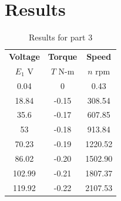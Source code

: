 \documentclass{article}
\begin{document}
\section{Results}

\begin{table}[H]
  \centering
  \begin{tabular}{*{3}{c}}

    \textbf{Voltage} & \textbf{Torque} & \textbf{Speed} \\
    $E_1$ V & $T$ N-m & $n$ rpm \\

    \hline

    0.04 &     0 &    0.43 \\
    18.84 & -0.15 &  308.54 \\
    35.6 & -0.17 &  607.85 \\
    53 & -0.18 &  913.84 \\
    70.23 & -0.19 & 1220.52 \\
    86.02 & -0.20 & 1502.90 \\
    102.99 & -0.21 & 1807.37 \\
    119.92 & -0.22 & 2107.53 \\
  \end{tabular}
  \caption{Results for part 3}
  \label{}
\end{table}
\end{document}
